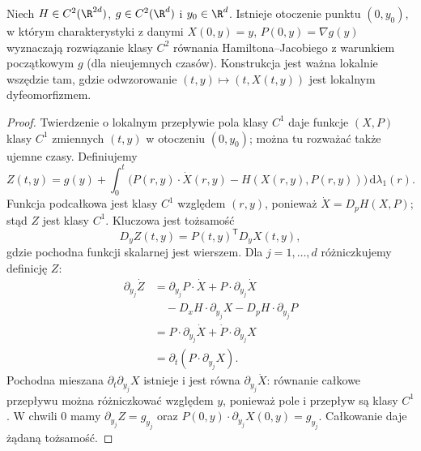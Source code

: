 \begin{stwierdzenie}
Niech $H\in C^2(\R^{2d})$, $g\in C^2(\R^d)$
i $y_0\in\R^d$. Istnieje otoczenie punktu $(0,y_0)$,
w którym charakterystyki z danymi
$X(0,y)=y$, $P(0,y)=\nabla g(y)$ wyznaczają
rozwiązanie klasy $C^2$ równania Hamiltona--Jacobiego
z warunkiem początkowym $g$ (dla nieujemnych czasów).
Konstrukcja jest ważna lokalnie wszędzie tam,
gdzie odwzorowanie $(t,y)\mapsto(t,X(t,y))$
jest lokalnym dyfeomorfizmem.
\end{stwierdzenie}
\begin{proof}
Twierdzenie o lokalnym przepływie pola klasy $C^1$
daje funkcje $(X,P)$ klasy $C^1$ zmiennych $(t,y)$
w otoczeniu $(0,y_0)$; można tu rozważać także
ujemne czasy. Definiujemy
\[
 Z(t,y)=g(y)+\int_0^t
 \bigl(P(r,y)\cdot\dot X(r,y)-H(X(r,y),P(r,y))\bigr)
 \,\mathrm d\lambda_1(r).
\]
Funkcja podcałkowa jest klasy $C^1$ względem $(r,y)$,
ponieważ $\dot X=D_pH(X,P)$; stąd $Z$ jest klasy $C^1$.
Kluczowa jest tożsamość
\[
 D_yZ(t,y)=P(t,y)^{\mathsf T}D_yX(t,y),
\]
gdzie pochodna funkcji skalarnej jest wierszem.
Dla $j=1,\ldots,d$ różniczkujemy definicję $Z$:
\[
 \begin{split}
 \partial_{y_j}\dot Z
 &=\partial_{y_j}P\cdot\dot X+
 P\cdot\partial_{y_j}\dot X\\
 &\quad-D_xH\cdot\partial_{y_j}X
          -D_pH\cdot\partial_{y_j}P\\
 &=P\cdot\partial_{y_j}\dot X+
          \dot P\cdot\partial_{y_j}X\\
 &=\partial_t(P\cdot\partial_{y_j}X).
 \end{split}
\]
Pochodna mieszana $\partial_t\partial_{y_j}X$
istnieje i jest równa $\partial_{y_j}\dot X$:
równanie całkowe przepływu można różniczkować
względem $y$, ponieważ pole i przepływ są klasy $C^1$.
W chwili $0$ mamy $\partial_{y_j}Z=g_{y_j}$
oraz $P(0,y)\cdot\partial_{y_j}X(0,y)=g_{y_j}$.
Całkowanie daje żądaną tożsamość.


\end{proof}
